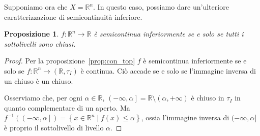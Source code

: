 \documentclass[a4paper, 11pt]{article}
\newcommand{\R}{\mathbb{R}}
\theoremstyle{plain} 	%
\newtheorem{proposizione}{Proposizione}
\theoremstyle{definition}
\theoremstyle{remark}
\begin{document}
    Supponiamo ora che $X=\R^{n}$. In questo caso, possiamo dare un'ulteriore caratterizzazione di semicontinuità inferiore.
    \begin{proposizione}
        $f\colon\R^{n}\to\R$ è semicontinua inferiormente se e solo se tutti i sottolivelli sono chiusi.
    \end{proposizione}
    \begin{proof}
        Per la proposizione~\ref{prop:con_top} $f$ è semicontinua inferiormente se e solo se $f\colon\R^n\to\left(\R,\tau_I\right)$ è continua. Ciò accade se e solo se l'immagine inversa di un chiuso è un chiuso.

        Osserviamo che, per ogni $\alpha\in\R$, $\left(-\infty,\alpha\right]=\R\setminus\left(\alpha,+\infty\right)$ è chiuso in $\tau_I$ in quanto complementare di un aperto. Ma $f^{-1}\left(\left(-\infty,\alpha\right]\right)=\left\{x\in\R^n\mid f(x)\le\alpha\right\}$, ossia l'immagine inversa di $(-\infty,\alpha]$ è proprio il sottolivello di livello $\alpha$.
    \end{proof}
\end{document}
